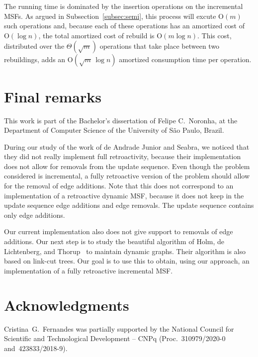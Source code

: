 \documentclass[reqno,11pt]{amsart}
\newcommand{\Oh}{\mathrm{O}}
\begin{document}
The running time is dominated by the insertion operations 
on the incremental MSFs.  As argued in Subsection~\ref{subsec:semi}, 
this process will excute $\Oh(m)$ such operations and, 
because each of these operations has an amortized cost of $\Oh(\log{n})$,
the total amortized cost of {\sc rebuild} is $\Oh(m \log{n})$.  This cost, distributed 
over the $\Theta(\sqrt{m})$ operations that take place between two rebuildings,
adds an $\Oh(\sqrt{m}\,\log{n})$ amortized consumption time per operation.

\section{Final remarks}\label{sec:final}

This work is part of the Bachelor's dissertation of Felipe C.\ Noronha, 
at the Department of Computer Science of the University of São Paulo, Brazil.

During our study of the work of de Andrade Junior and Seabra, we noticed 
that they did not really implement full retroactivity, because their 
implementation does not allow for removals from the update sequence. 
Even though the problem considered is incremental, a fully retroactive 
version of the problem should allow for the removal of edge additions.
Note that this does not correspond to an implementation of a retroactive 
dynamic MSF, because it does not keep in the update sequence edge 
additions and edge removals.  The update sequence contains only 
edge additions. 

Our current implementation also does not give support to removals of edge additions.
Our next step is to study the beautiful algorithm of Holm, de Lichtenberg, and 
Thorup~\cite{HolmLT2001} to maintain dynamic graphs.  Their algorithm is also 
based on link-cut trees.  Our goal is to use this to obtain, using our approach, 
an implementation of a fully retroactive incremental MSF. 

\section*{Acknowledgments}

Cristina~G.~Fernandes was partially supported by the National Council for Scientific
and Technological Development -- CNPq (Proc.~310979/2020-0 and~423833/2018-9).



\end{document}
